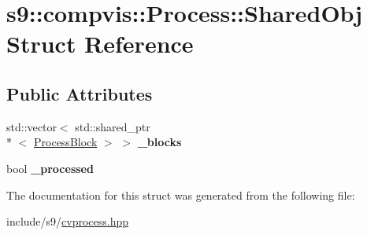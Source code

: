 \hypertarget{structs9_1_1compvis_1_1Process_1_1SharedObj}{\section{s9\-:\-:compvis\-:\-:Process\-:\-:Shared\-Obj Struct Reference}
\label{structs9_1_1compvis_1_1Process_1_1SharedObj}
}
\subsection*{Public Attributes}
\begin{DoxyCompactItemize}
\item 
\hypertarget{structs9_1_1compvis_1_1Process_1_1SharedObj_a24b21fbf48c1277a6c233e9e47e0c3de}{std\-::vector$<$ std\-::shared\-\_\-ptr\\*
$<$ \hyperlink{classs9_1_1compvis_1_1ProcessBlock}{Process\-Block} $>$ $>$ {\bfseries \-\_\-blocks}}\label{structs9_1_1compvis_1_1Process_1_1SharedObj_a24b21fbf48c1277a6c233e9e47e0c3de}

\item 
\hypertarget{structs9_1_1compvis_1_1Process_1_1SharedObj_a9a81f3d2f6a292d40f49b7ded0acebb1}{bool {\bfseries \-\_\-processed}}\label{structs9_1_1compvis_1_1Process_1_1SharedObj_a9a81f3d2f6a292d40f49b7ded0acebb1}

\end{DoxyCompactItemize}


The documentation for this struct was generated from the following file\-:\begin{DoxyCompactItemize}
\item 
include/s9/\hyperlink{cvprocess_8hpp}{cvprocess.\-hpp}\end{DoxyCompactItemize}
